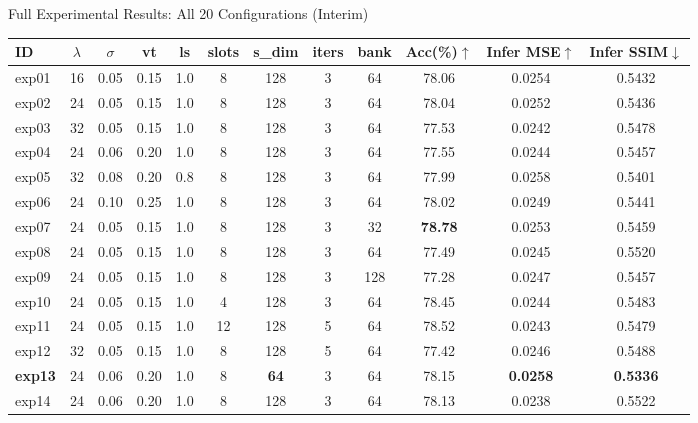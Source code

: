 \documentclass[aspectratio=169, 10pt]{beamer}
\begin{document}
\begin{frame}{Full Experimental Results: All 20 Configurations {\small\color{warnorg}(Interim)}}

\vspace{-0.15cm}
\begin{center}
\tiny\setlength{\tabcolsep}{2.5pt}
\renewcommand{\arraystretch}{0.95}
\begin{tabular}{l|cccc|cccc|ccc}
\toprule
\textbf{ID} & $\lambda$ & $\sigma$ & \textbf{vt} & \textbf{ls} & \textbf{slots} & \textbf{s\_dim} & \textbf{iters} & \textbf{bank} & \textbf{Acc(\%)}$\uparrow$ & \textbf{Infer MSE}$\uparrow$ & \textbf{Infer SSIM}$\downarrow$ \\
\midrule
exp01 & 16 & 0.05 & 0.15 & 1.0 & 8 & 128 & 3 & 64 & 78.06 & 0.0254 & 0.5432 \\
exp02 & 24 & 0.05 & 0.15 & 1.0 & 8 & 128 & 3 & 64 & 78.04 & 0.0252 & 0.5436 \\
exp03 & 32 & 0.05 & 0.15 & 1.0 & 8 & 128 & 3 & 64 & 77.53 & 0.0242 & 0.5478 \\
exp04 & 24 & 0.06 & 0.20 & 1.0 & 8 & 128 & 3 & 64 & 77.55 & 0.0244 & 0.5457 \\
exp05 & 32 & 0.08 & 0.20 & 0.8 & 8 & 128 & 3 & 64 & 77.99 & 0.0258 & 0.5401 \\
exp06 & 24 & 0.10 & 0.25 & 1.0 & 8 & 128 & 3 & 64 & 78.02 & 0.0249 & 0.5441 \\
exp07 & 24 & 0.05 & 0.15 & 1.0 & 8 & 128 & 3 & 32 & \textbf{78.78} & 0.0253 & 0.5459 \\
exp08 & 24 & 0.05 & 0.15 & 1.0 & 8 & 128 & 3 & 64 & 77.49 & 0.0245 & 0.5520 \\
exp09 & 24 & 0.05 & 0.15 & 1.0 & 8 & 128 & 3 & 128 & 77.28 & 0.0247 & 0.5457 \\
exp10 & 24 & 0.05 & 0.15 & 1.0 & 4 & 128 & 3 & 64 & 78.45 & 0.0244 & 0.5483 \\
exp11 & 24 & 0.05 & 0.15 & 1.0 & 12 & 128 & 5 & 64 & 78.52 & 0.0243 & 0.5479 \\
exp12 & 32 & 0.05 & 0.15 & 1.0 & 8 & 128 & 5 & 64 & 77.42 & 0.0246 & 0.5488 \\
\rowcolor{yellow!12}
\textbf{exp13} & 24 & 0.06 & 0.20 & 1.0 & 8 & \textbf{64} & 3 & 64 & 78.15 & \textbf{0.0258} & \textbf{0.5336} \\
exp14 & 24 & 0.06 & 0.20 & 1.0 & 8 & 128 & 3 & 64 & 78.13 & 0.0238 & 0.5522 \\

\end{tabular}
\end{center}
\end{frame}
\end{document}
